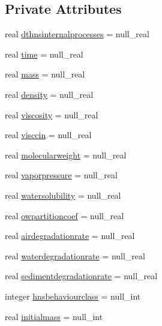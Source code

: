 \subsection*{Private Attributes}
\begin{DoxyCompactItemize}
\item 
real \mbox{\hyperlink{structmodulehns_1_1t__var_afd50f146afe18ac7f9b5fc34daf8e47b}{dthnsinternalprocesses}} = null\+\_\+real
\item 
real \mbox{\hyperlink{structmodulehns_1_1t__var_a4fba6d6975c285af2bf37018ba0c77b0}{time}} = null\+\_\+real
\item 
real \mbox{\hyperlink{structmodulehns_1_1t__var_ad256bf4bc30a9948d5aa3b89ba08b54f}{mass}} = null\+\_\+real
\item 
real \mbox{\hyperlink{structmodulehns_1_1t__var_ab4fdced0d128ebfd37c07e8fd52f309d}{density}} = null\+\_\+real
\item 
real \mbox{\hyperlink{structmodulehns_1_1t__var_aec496799c5ffe317bf90c241274b46e4}{viscosity}} = null\+\_\+real
\item 
real \mbox{\hyperlink{structmodulehns_1_1t__var_a9d37615309f6ee57201c65e24b3a4d8e}{visccin}} = null\+\_\+real
\item 
real \mbox{\hyperlink{structmodulehns_1_1t__var_afc5ebe5c21f0a8192059a19e9bd4bfdc}{molecularweight}} = null\+\_\+real
\item 
real \mbox{\hyperlink{structmodulehns_1_1t__var_acd72a9bcaff27784c0542b1ecb1618b2}{vaporpressure}} = null\+\_\+real
\item 
real \mbox{\hyperlink{structmodulehns_1_1t__var_a46ed490881cba886fb064f7899830821}{watersolubility}} = null\+\_\+real
\item 
real \mbox{\hyperlink{structmodulehns_1_1t__var_a3a89d0e7d81c92744a73ae2b22d002e0}{owpartitioncoef}} = null\+\_\+real
\item 
real \mbox{\hyperlink{structmodulehns_1_1t__var_a9074441d9b16de5004cb4ac3b0cb0c64}{airdegradationrate}} = null\+\_\+real
\item 
real \mbox{\hyperlink{structmodulehns_1_1t__var_a0d5cf40f11c14c11587383390156bd15}{waterdegradationrate}} = null\+\_\+real
\item 
real \mbox{\hyperlink{structmodulehns_1_1t__var_ab543f5d6785426a31aa5a6520efd776e}{sedimentdegradationrate}} = null\+\_\+real
\item 
integer \mbox{\hyperlink{structmodulehns_1_1t__var_a756a75573e8c5394d68c35ffdb090680}{hnsbehaviourclass}} = null\+\_\+int
\item 
real \mbox{\hyperlink{structmodulehns_1_1t__var_a715a063a339e09bd4ffab7eb969ab4c8}{initialmass}} = null\+\_\+int

\end{DoxyCompactItemize}
